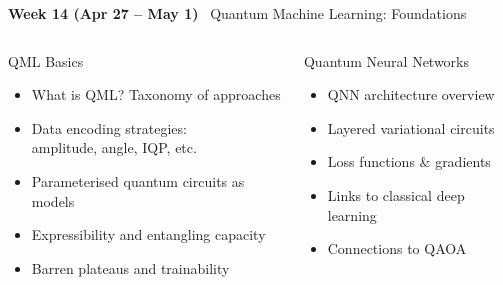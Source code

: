 \documentclass[aspectratio=169,10pt]{beamer}
\newcommand{\week}[1]{\textcolor{blue!60!black}{\textbf{#1}}}
\begin{document}
\begin{frame}{\week{Week 14 (Apr 27 -- May 1)} \ Quantum Machine Learning: Foundations}
  \begin{columns}[T]
      \begin{block}{QML Basics}
        \begin{itemize}
          \item What is QML? Taxonomy of approaches
          \item Data encoding strategies:\\
                amplitude, angle, IQP, etc.
          \item Parameterised quantum circuits as models
          \item Expressibility and entangling capacity
          \item Barren plateaus and trainability
        \end{itemize}
      \end{block}
      \begin{block}{Quantum Neural Networks}
        \begin{itemize}
          \item QNN architecture overview
          \item Layered variational circuits
          \item Loss functions \& gradients
          \item Links to classical deep learning
          \item Connections to QAOA
        \end{itemize}
      \end{block}
  \end{columns}
\end{frame}
\end{document}
